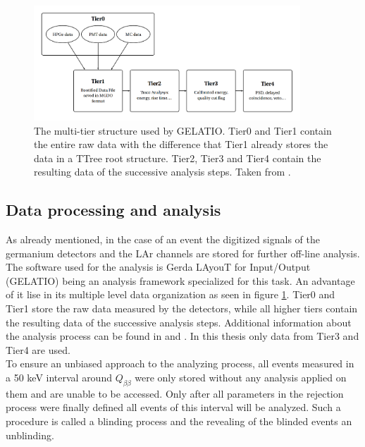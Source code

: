 \documentclass[encoding=utf8,british]{tumphthesis}
\begin{document}
\begin{figure}[t!]
	\centering
		\includegraphics[width=100mm]{./Bilder/TierStructure.png}
		\caption{
		The multi-tier structure used by GELATIO. 
		Tier0 and Tier1 contain the entire raw data with the difference that Tier1 already stores the data in a TTree root structure.
		Tier2, Tier3 and Tier4 contain the resulting data of the successive analysis steps.
		Taken from \cite{agostini_gelatio:_2011}.
		}
		\label{fig:TierStructure}
\end{figure}

\subsection{Data processing and analysis}
\label{sec:DataProc}



As already mentioned, in the case of an event the digitized signals of the germanium detectors and the LAr channels are stored for further off-line analysis.
The software used for the analysis is Gerda LAyouT for Input/Output (GELATIO) being an analysis framework specialized for this task.
An advantage of it lise in its multiple level data organization as seen in figure \ref{fig:TierStructure}.
Tier0 and Tier1 store the raw data measured by the detectors, while all higher tiers contain the resulting data of the successive analysis steps.
Additional information about the analysis process can be found in \cite{agostini_gelatio:_2011} and \cite{agostini_off-line_2011}.
In this thesis only data from Tier3 and Tier4 are used.
\\

To ensure an unbiased approach to the analyzing process, all events measured in a  50 keV interval around $Q_{\beta\beta}$ were only stored without any analysis applied on them and are unable to be accessed.
Only after all parameters in the rejection process were finally defined all events of this interval will be analyzed.
Such a procedure is called a blinding process and the revealing of the blinded events an unblinding.
\\
\end{document}
